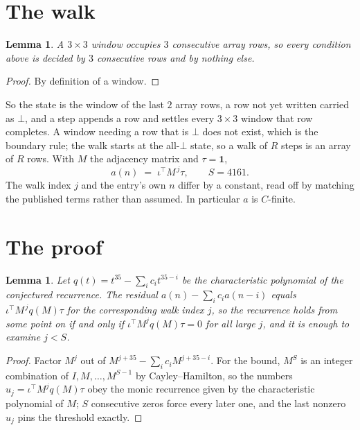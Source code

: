 \documentclass[11pt,a4paper]{article}
\theoremstyle{plain}
\newtheorem{lemma}[theorem]{Lemma}
\theoremstyle{definition}
\begin{document}
\section{The walk}

\begin{lemma}\label{lem:win}
A $3\times3$ window occupies $3$ consecutive array rows, so every condition above is
decided by $3$ consecutive rows and by nothing else.
\end{lemma}

\begin{proof}
By definition of a window.
\end{proof}

So the state is the window of the last $2$ array rows, a row not yet written carried as
$\bot$, and a step appends a row and settles every $3\times3$ window that row completes. A
window needing a row that is $\bot$ does not exist, which is the boundary rule; the walk starts
at the all-$\bot$ state, so a walk of $R$ steps is an array of $R$ rows. With $M$ the adjacency
matrix and $\tau=\mathbf{1}$,
\[
a(n)\;=\;\iota^{\!\top}M^{\,j}\tau ,\qquad S=4161.
\]
The walk index $j$ and the entry's own $n$ differ by a constant, read off by matching the
published terms rather than assumed. In particular $a$ is $C$-finite.

\section{The proof}

\begin{lemma}\label{lem:crit}
Let $q(t)=t^{35}-\sum_i c_it^{35-i}$ be the characteristic polynomial of the
conjectured recurrence. The residual $a(n)-\sum_ic_ia(n-i)$ equals
$\iota^{\!\top}M^{\,j}q(M)\tau$ for the corresponding walk index $j$, so the recurrence
holds from some point on if and only if $\iota^{\!\top}M^{j}q(M)\tau=0$ for all large $j$,
and it is enough to examine $j<S$.
\end{lemma}

\begin{proof}
Factor $M^{j}$ out of $M^{j+35}-\sum_ic_iM^{j+35-i}$. For the bound, $M^{S}$
is an integer combination of $I,M,\dots,M^{S-1}$ by Cayley--Hamilton, so the numbers
$u_j=\iota^{\!\top}M^{j}q(M)\tau$ obey the monic recurrence given by the characteristic
polynomial of $M$; $S$ consecutive zeros force every later one, and the last nonzero $u_j$
pins the threshold exactly.
\end{proof}
\end{document}
